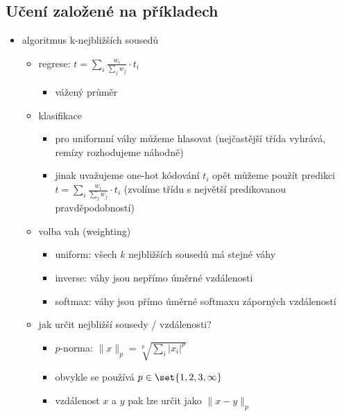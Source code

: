 \subsection{Učení založené na příkladech}
\begin{itemize}
\item algoritmus k-nejbližších sousedů
\begin{itemize}
\item regrese: $t=\sum_i\frac{w_i}{\sum_j w_j}\cdot t_i$
\begin{itemize}
\item vážený průměr
\end{itemize}
\item klasifikace
\begin{itemize}
\item pro uniformní váhy můžeme hlasovat (nejčastější třída vyhrává, remízy rozhodujeme náhodně)
\item jinak uvažujeme one-hot kódování $t_i$ opět můžeme použít predikci $t=\sum_i\frac{w_i}{\sum_j w_j}\cdot t_i$ (zvolíme třídu s největší predikovanou pravděpodobností)
\end{itemize}
\item volba vah (weighting)
\begin{itemize}
\item uniform: všech $k$ nejbližších sousedů má stejné váhy
\item inverse: váhy jsou nepřímo úměrné vzdálenosti
\item softmax: váhy jsou přímo úměrné softmaxu záporných vzdáleností
\end{itemize}
\item jak určit nejbližší sousedy / vzdálenosti?
\begin{itemize}
\item $p$-norma: $\|x\|_p=\sqrt[p]{\sum_i|x_i|^p}$
\item obvykle se používá $p\in\set{1,2,3,\infty}$
\item vzdálenost $x$ a $y$ pak lze určit jako $\|x-y\|_p$
\end{itemize}
\end{itemize}
\end{itemize}
